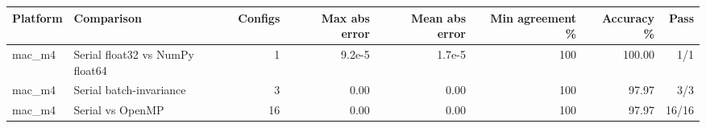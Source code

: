 \begin{tabular}{llrrrrrr}
\toprule
Platform & Comparison & Configs & Max abs error & Mean abs error & Min agreement \% & Accuracy \% & Pass \\
\midrule
mac\_m4 & Serial float32 vs NumPy float64 & 1 & 9.2e-5 & 1.7e-5 & 100 & 100.00 & 1/1 \\
mac\_m4 & Serial batch-invariance & 3 & 0.00 & 0.00 & 100 & 97.97 & 3/3 \\
mac\_m4 & Serial vs OpenMP & 16 & 0.00 & 0.00 & 100 & 97.97 & 16/16 \\
\bottomrule
\end{tabular}
